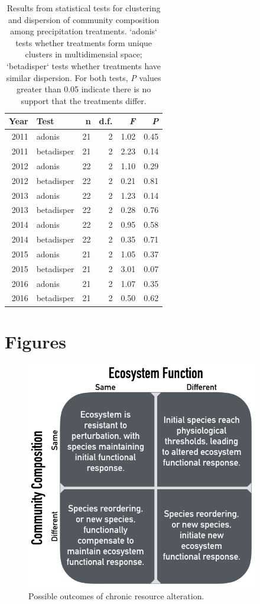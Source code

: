 \documentclass[fleqn,10pt]{wlpeerj} %
\begin{document}
\begin{table}[ht]
\centering
\caption{Results from statistical tests for clustering and dispersion of community composition among precipitation treatments. `adonis` tests whether treatments form unique clusters in multidimensial space; `betadisper` tests whether treatments have similar dispersion. For both tests, \emph{P} values greater than 0.05 indicate there is no support that the treatments differ.} 
\begingroup\normalsize
\begin{tabular}{rlrrrr}
  \hline
Year & Test & n & d.f. & \emph{F} & \emph{P} \\ 
  \hline
2011 & adonis &  21 &   2 & 1.02 & 0.45 \\ 
  2011 & betadisper &  21 &   2 & 2.23 & 0.14 \\ 
  2012 & adonis &  22 &   2 & 1.10 & 0.29 \\ 
  2012 & betadisper &  22 &   2 & 0.21 & 0.81 \\ 
  2013 & adonis &  22 &   2 & 1.23 & 0.14 \\ 
  2013 & betadisper &  22 &   2 & 0.28 & 0.76 \\ 
  2014 & adonis &  22 &   2 & 0.95 & 0.58 \\ 
  2014 & betadisper &  22 &   2 & 0.35 & 0.71 \\ 
  2015 & adonis &  21 &   2 & 1.05 & 0.37 \\ 
  2015 & betadisper &  21 &   2 & 3.01 & 0.07 \\ 
  2016 & adonis &  21 &   2 & 1.07 & 0.35 \\ 
  2016 & betadisper &  21 &   2 & 0.50 & 0.62 \\ 
   \hline
\end{tabular}
\endgroup
\end{table}

\newpage{}

\section{Figures}\label{figures}

\begin{figure}[!ht]
  \centering
      \includegraphics[width=4in]{../figures/hypothesis_figtable.png}
  \caption{Possible outcomes of chronic resource alteration.}
\end{figure}
\end{document}
